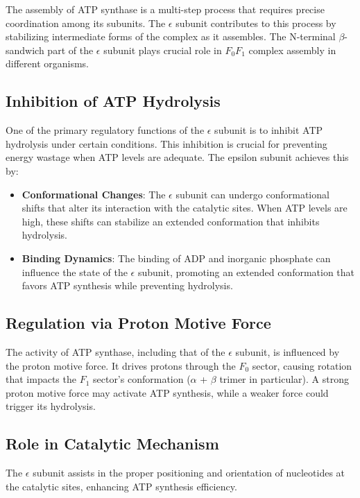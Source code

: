 \documentclass{article}
\begin{document}
The assembly of ATP synthase is a multi-step process that requires precise coordination among its subunits. The $\epsilon$ subunit contributes to this process by stabilizing intermediate forms of the complex as it assembles.
The N-terminal $\beta$-sandwich part of the $\epsilon$ subunit plays crucial role in \textit{$F_0F_1$} complex assembly in different organisms.

\subsection{Inhibition of ATP Hydrolysis}

One of the primary regulatory functions of the $\epsilon$ subunit is to inhibit ATP hydrolysis under certain conditions. This inhibition is crucial for preventing energy wastage when ATP levels are adequate. The epsilon subunit achieves this by:

\begin{itemize}
    \item  \textbf{Conformational Changes}: The $\epsilon$ subunit can undergo conformational shifts that alter its interaction with the catalytic sites. When ATP levels are high, these shifts can stabilize an extended conformation that inhibits hydrolysis.
    \item  \textbf{Binding Dynamics}: The binding of ADP and inorganic phosphate can influence the state of the $\epsilon$ subunit, promoting an extended conformation that favors ATP synthesis while preventing hydrolysis.
\end{itemize}

\subsection{Regulation via Proton Motive Force}

The activity of ATP synthase, including that of the $\epsilon$ subunit, is influenced by the proton motive force. It drives protons through the \textit{$F_0$} sector, causing rotation that impacts the \textit{$F_1$} sector's conformation ($\alpha$ + $\beta$ trimer in particular). A strong proton motive force may activate ATP synthesis, while a weaker force could trigger its hydrolysis.

\subsection{Role in Catalytic Mechanism}

The $\epsilon$ subunit assists in the proper positioning and orientation of nucleotides at the catalytic sites, enhancing ATP synthesis efficiency.
\end{document}
